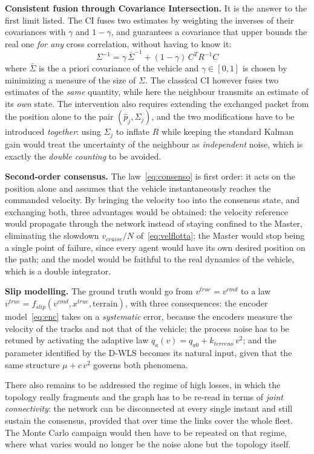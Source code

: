 \documentclass[conference,9pt]{IEEEtran}
\begin{document}
\textbf{Consistent fusion through Covariance Intersection.} It is the answer to
the first limit listed. The CI \cite{julier1997} fuses two estimates by
weighting the inverses of their covariances with $\gamma$ and $1-\gamma$, and
guarantees a covariance that upper bounds the real one \emph{for any} cross
correlation, without having to know it:
\begin{equation}
\Sigma^{-1} = \gamma\,\bar\Sigma^{-1} + (1-\gamma)\,C^T R^{-1} C
\label{eq:ci}
\end{equation}
where $\bar\Sigma$ is the a priori covariance of the vehicle and
$\gamma \in [0,1]$ is chosen by minimizing a measure of the size of $\Sigma$.
The classical CI however fuses two estimates of the \emph{same} quantity, while
here the neighbour transmits an estimate of its \emph{own} state.
The intervention also requires extending the exchanged packet from the position
alone to the pair $(\hat p_j, \Sigma_j)$, and the two modifications have to be
introduced \emph{together}: using $\Sigma_j$ to inflate $R$ while keeping the
standard Kalman gain would treat the uncertainty of the neighbour as
\emph{independent} noise, which is exactly the \emph{double counting} to be
avoided.

\textbf{Second-order consensus.} The law~\eqref{eq:consenso} is first order: it
acts on the position alone and assumes that the vehicle instantaneously reaches
the commanded velocity. By bringing the velocity too into the consensus state,
and exchanging both, three advantages would be obtained: the velocity reference
would propagate through the network instead of staying confined to the Master,
eliminating the slowdown $v_{cruise}/N$ of~\eqref{eq:velflotta}; the Master
would stop being a single point of failure, since every agent would have its
own desired position on the path; and the model would be faithful to the real
dynamics of the vehicle, which is a double integrator.

\textbf{Slip modelling.} The ground truth would go from $v^{true} = v^{cmd}$ to
a law $v^{true} = f_{slip}(v^{cmd}, x^{true}, \text{terrain})$, with three
consequences: the encoder model~\eqref{eq:enc} takes on a \emph{systematic}
error, because the encoders measure the velocity of the tracks and not that of
the vehicle; the process noise has to be retuned by activating the adaptive law
$q_a(v) = q_{a0} + k_{terreno}\,v^2$; and the parameter identified by the D-WLS
becomes its natural input, given that the same structure $\mu + c\,v^2$ governs
both phenomena.

There also remains to be addressed the regime of high losses, in which the
topology really fragments and the graph has to be re-read in terms of
\emph{joint connectivity}: the network can be disconnected at every single
instant and still sustain the consensus, provided that over time the links
cover the whole fleet. The Monte Carlo campaign would then have to be repeated
on that regime, where what varies would no longer be the noise alone but the
topology itself.
\end{document}
